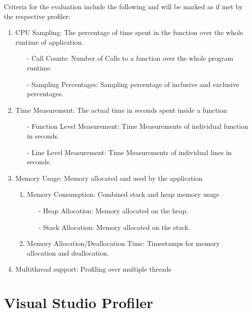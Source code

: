 \vfill\break
Criteria for the evaluation include the following and will be marked as \CheckedBox \text{ } if met by the respective profiler:

\begin{enumerate}
    \item CPU Sampling: The percentage of time spent in the function over the whole runtime of application.
        \begin{enumerate}
            \item[-] Call Counts: Number of Calls to a function over the whole program runtime.
            \item[-] Sampling Percentages: Sampling percentage of inclusive and exclusive percentages.
        \end{enumerate}
    \item Time Measurement: The actual time in seconds spent inside a function
        \begin{enumerate}
            \item[-] Function Level Measurement: Time Measurements of individual function in seconds.
            \item[-] Line Level Measurement: Time Measurements of individual lines in seconds.
        \end{enumerate}
    \item Memory Usage: Memory allocated and used by the application
        \begin{enumerate}[label*=\arabic*.]
            \item Memory Consumption: Combined stack and heap memory usage
                \begin{enumerate}
                    \item[-] Heap Allocation: Memory allocated on the heap.
                    \item[-] Stack Allocation: Memory allocated on the stack.
                \end{enumerate}
            \item Memory Allocation/Deallocation Time: Timestamps for memory allocation and deallocation.
        \end{enumerate}
    \item Multithread support: Profiling over multiple threads  
\end{enumerate}

\section{Visual Studio Profiler}

